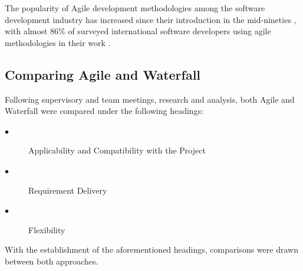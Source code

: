 The popularity of Agile development methodologies among the software development industry has increased since their introduction in the mid-nineties \cite{AGILE_SURVEY}, with almost 86\% of surveyed international software developers using agile methodologies in their work \cite{AGILE_SURVEY_TWO}.

\subsection{Comparing Agile and Waterfall}
Following supervisory and team meetings, research and analysis, both Agile and Waterfall were compared under the following headings:

\begin{description}
  \item[$\bullet$] Applicability and Compatibility with the Project
  \item[$\bullet$] Requirement Delivery
  \item[$\bullet$] Flexibility
\end{description}

With the establishment of the aforementioned headings, comparisons were drawn between both approaches.

